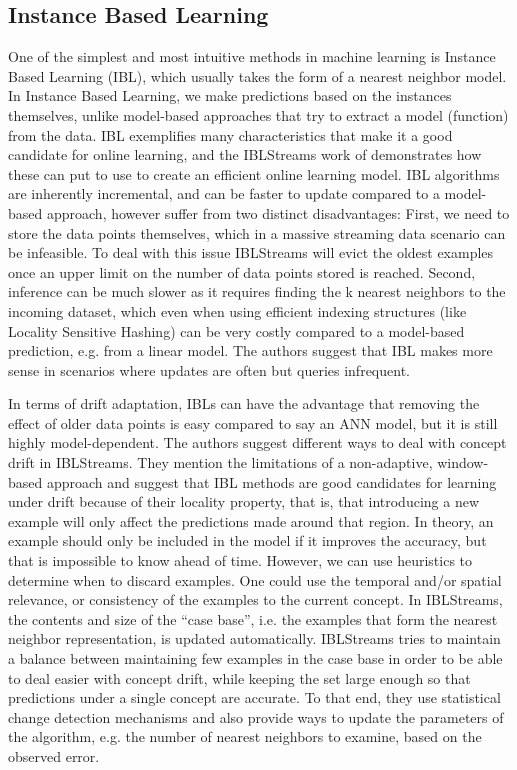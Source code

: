 \subsection*{Instance Based Learning}
One of the simplest and most intuitive methods in machine learning
is Instance Based Learning (IBL), which usually takes the form of
a nearest neighbor model.
In Instance Based Learning, we make predictions based on the instances themselves, unlike
model-based approaches that try to extract a model (function) from the
data. IBL exemplifies many characteristics
that make it a good candidate for online learning, and the
IBLStreams work of \citet{ibl-streams} demonstrates how these
can put to use to create an efficient online learning model.
IBL algorithms are inherently incremental, and can be faster to
update compared to a model-based approach, however suffer from two
distinct disadvantages: First, we need to store the data points themselves, which in a
massive streaming data scenario can be infeasible. To deal with this
issue IBLStreams will evict the oldest examples once an upper limit on
the number of data points stored is reached. Second, inference can be much slower as it requires
finding the k nearest neighbors to the incoming dataset, which even when
using efficient indexing structures (like Locality Sensitive Hashing\cite{lsh-indyk, lsh-gionis}) can be very costly
compared to a model-based prediction, e.g. from a linear model. The
authors suggest that IBL makes more sense in scenarios where updates are
often but queries infrequent.

In terms of drift adaptation, IBLs can have
the advantage that removing the effect of older data points is easy
compared to say an ANN model, but it is still highly model-dependent.
The authors suggest different ways to deal with
concept drift in IBLStreams. They mention the limitations of a non-adaptive, window-based
approach and suggest that IBL methods are good candidates for learning
under drift because of their locality property, that is, that introducing
a new example will only affect the predictions made around that region.
In theory, an example should only be included in the model if it improves the
accuracy, but that is impossible to know ahead of time. However, we can use heuristics
to determine when to discard examples. One could use the temporal and/or spatial
relevance, or consistency of the examples to the current concept.
In IBLStreams, the contents and size of the ``case base'',
i.e. the examples that form the nearest neighbor representation, is
updated automatically. IBLStreams tries to maintain a balance between
maintaining few examples in the case base in order to be able to deal
easier with concept drift, while keeping the set large enough so that
predictions under a single concept are accurate. To that end, they
use statistical change detection mechanisms and also provide ways
to update the parameters of the algorithm, e.g. the number of nearest
neighbors to examine, based on the observed error.

